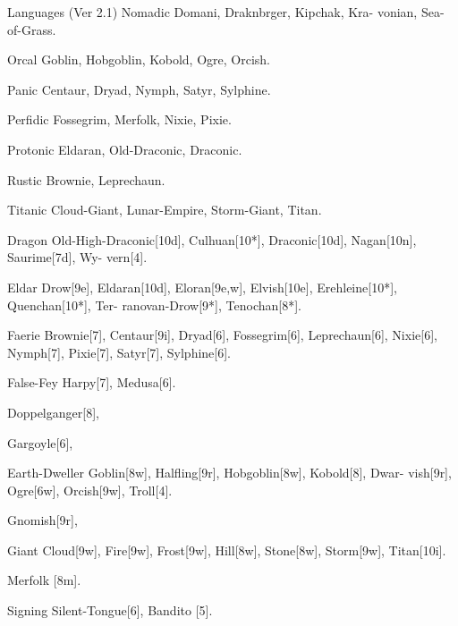 \begin{Chapter}{Languages (Ver 2.1)}
Nomadic  Domani,  Draknbrger,  Kipchak,  Kra-
vonian, Sea-of-Grass. 

Orcal Goblin, Hobgoblin, Kobold, Ogre, Orcish.  

Panic Centaur, Dryad, Nymph, Satyr, Sylphine.  

Perfidic Fossegrim, Merfolk, Nixie, Pixie.  

Protonic Eldaran, Old-Draconic, Draconic.  

Rustic Brownie, Leprechaun. 

Titanic  Cloud-Giant,  Lunar-Empire,  Storm-Giant, 
Titan. 

 

 

Dragon  Old-High-Draconic[10d],  Culhuan[10*], 
Draconic[10d],  Nagan[10n],  Saurime[7d],  Wy-
vern[4]. 

Eldar  Drow[9e],  Eldaran[10d],  Eloran[9e,w], 
Elvish[10e],  Erehleine[10*],  Quenchan[10*],  Ter-
ranovan-Drow[9*], Tenochan[8*]. 

Faerie  Brownie[7],  Centaur[9i],  Dryad[6], 
Fossegrim[6], Leprechaun[6], Nixie[6], Nymph[7], 
Pixie[7], Satyr[7], Sylphine[6]. 

False-Fey 
Harpy[7], Medusa[6]. 

Doppelganger[8], 

Gargoyle[6], 

Earth-Dweller 
Goblin[8w], 
Halfling[9r],  Hobgoblin[8w],  Kobold[8],  Dwar-
vish[9r], Ogre[6w], Orcish[9w], Troll[4]. 

Gnomish[9r], 

Giant  Cloud[9w],  Fire[9w],  Frost[9w],  Hill[8w], 
Stone[8w], Storm[9w], Titan[10i]. 

Merfolk [8m]. 

Signing Silent-Tongue[6], Bandito [5]. 



\end{Chapter}

